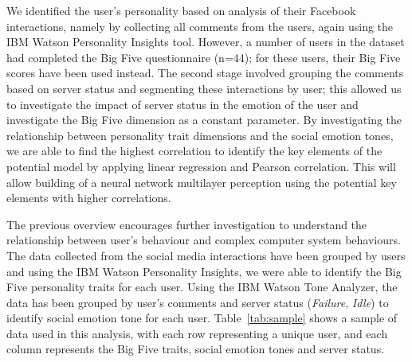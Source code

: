 \documentclass[graybox]{svmult}
\begin{document}
{We identified the user's personality based on analysis of their
Facebook interactions, namely by collecting all comments from the
users, again using the IBM Watson Personality Insights tool. However,
a number of users in the dataset had completed the Big Five
questionnaire (n=44); for these users, their Big Five scores have
been used instead. The second stage involved grouping the comments
based on server status and segmenting these interactions by user; this
allowed us to investigate the impact of server status in the emotion
of the user and investigate the Big Five dimension as a constant
parameter. By investigating the relationship between personality trait
dimensions and the social emotion tones, we are able to find the
highest correlation to identify the key elements of the potential
model by applying linear regression and Pearson correlation. This will
allow building of a neural network multilayer perception using the
potential key elements with higher correlations.

The previous overview encourages further investigation to understand
the relationship between user's behaviour and complex computer system
behaviours. The data collected from the social media interactions have
been grouped by users and using the IBM Watson Personality Insights,
we were able to identify the Big Five personality traits for each
user. Using the IBM Watson Tone Analyzer, the data has been grouped by
user's comments and server status ({\emph{Failure}}, {\emph{Idle}}) to
identify social emotion tone for each user. Table~\ref{tab:sample}
shows a sample of data used in this analysis, with each row
representing a unique user, and each column represents the Big Five
traits, social emotion tones and server status.

}
\end{document}
